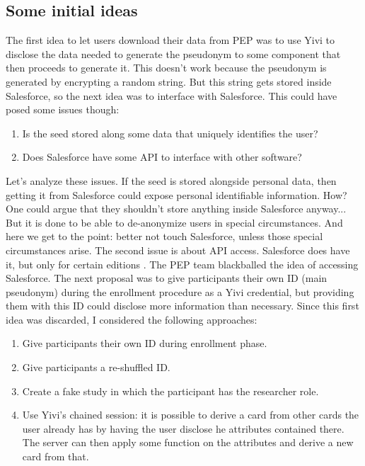 \documentclass{report}
\begin{document}
\subsection{Some initial ideas}
The first idea to let users download their data from PEP was to use Yivi to disclose the data needed to generate the pseudonym to some component that then proceeds to generate it.
This doesn't work because the pseudonym is generated by encrypting a random string. But this string gets stored inside Salesforce, so the next idea was to interface with
Salesforce. This could have posed some issues though:
\begin{enumerate}
		\item Is the seed stored along some data that uniquely identifies the user?
		\item Does Salesforce have some API to interface with other software?
\end{enumerate}
Let's analyze these issues. If the seed is stored alongside personal data, then getting it from Salesforce could expose personal identifiable information. How? One could argue that
they shouldn't store anything inside Salesforce anyway... But it is done to be able to de-anonymize users in special circumstances. And here we get to the point: better not touch
Salesforce, unless those special circumstances arise. The second issue is about API access. Salesforce does have it, but only for certain editions \cite{salesforce}. The PEP team
blackballed the idea of accessing Salesforce. The next proposal was to give participants their own ID (main pseudonym) during the enrollment procedure as a Yivi credential, but
providing them with this ID could disclose more information than necessary.
Since this first idea was discarded, I considered the following approaches:
\begin{enumerate}
		\item Give participants their own ID during enrollment phase.
		\item Give participants a re-shuffled ID.
		\item Create a fake study in which the participant has the researcher role.
		\item Use Yivi’s chained session: it is possible to derive a card from other cards the user already has by having the user disclose he attributes contained there. The server can then apply some function on the attributes and derive a new card from that.
\end{enumerate}
\end{document}
